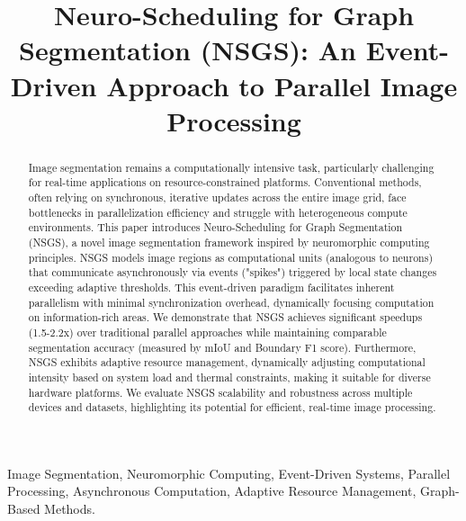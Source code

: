 \documentclass[conference]{IEEEtran}
\begin{document}
\title{Neuro-Scheduling for Graph Segmentation (NSGS): An Event-Driven Approach to Parallel Image Processing}

\author{
\and
{}
}

\maketitle

\begin{abstract}
Image segmentation remains a computationally intensive task, particularly challenging for real-time applications on resource-constrained platforms. Conventional methods, often relying on synchronous, iterative updates across the entire image grid, face bottlenecks in parallelization efficiency and struggle with heterogeneous compute environments. This paper introduces Neuro-Scheduling for Graph Segmentation (NSGS), a novel image segmentation framework inspired by neuromorphic computing principles. NSGS models image regions as computational units (analogous to neurons) that communicate asynchronously via events ("spikes") triggered by local state changes exceeding adaptive thresholds. This event-driven paradigm facilitates inherent parallelism with minimal synchronization overhead, dynamically focusing computation on information-rich areas. We demonstrate that NSGS achieves significant speedups (1.5-2.2x) over traditional parallel approaches while maintaining comparable segmentation accuracy (measured by mIoU and Boundary F1 score). Furthermore, NSGS exhibits adaptive resource management, dynamically adjusting computational intensity based on system load and thermal constraints, making it suitable for diverse hardware platforms. We evaluate NSGS scalability and robustness across multiple devices and datasets, highlighting its potential for efficient, real-time image processing.
\end{abstract}

\begin{IEEEkeywords}
Image Segmentation, Neuromorphic Computing, Event-Driven Systems, Parallel Processing, Asynchronous Computation, Adaptive Resource Management, Graph-Based Methods.
\end{IEEEkeywords}
\end{document}
